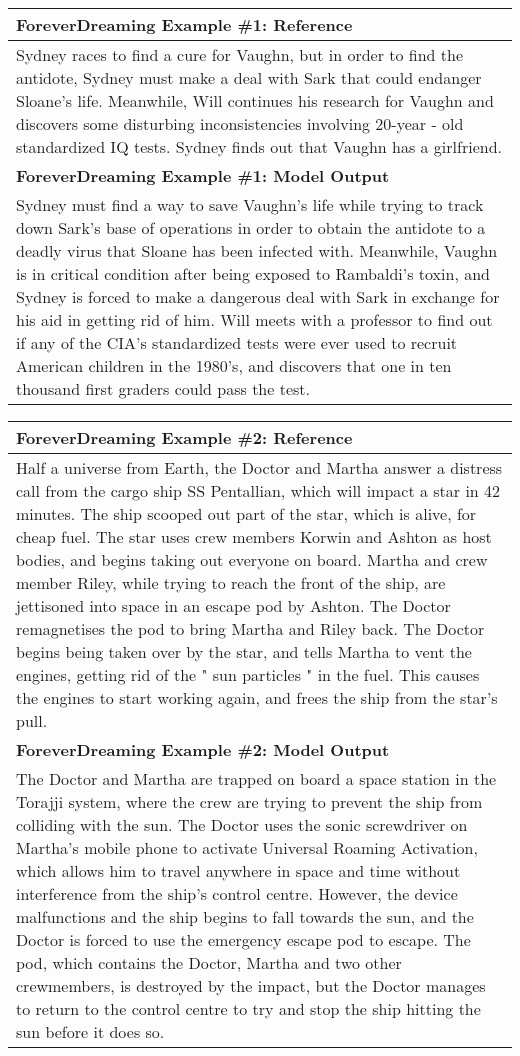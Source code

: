 \documentclass{article} \usepackage{iclr2022_conference,times}
\begin{document}
\begin{table}[!htbp]
    \centering
    \tiny
    \begin{tabular}{p{\linewidth}} 
    \toprule
    \textbf{ForeverDreaming Example \#1: Reference} \\
    \midrule
    Sydney races to find a cure for Vaughn, but in order to find the antidote, Sydney must make a deal with Sark that could endanger Sloane's life. Meanwhile, Will continues his research for Vaughn and discovers some disturbing inconsistencies involving 20-year - old standardized IQ tests. Sydney finds out that Vaughn has a girlfriend.
    \\
    \midrule
    \textbf{ForeverDreaming Example \#1: Model Output} \\
    \midrule
    Sydney must find a way to save Vaughn's life while trying to track down Sark's base of operations in order to obtain the antidote to a deadly virus that Sloane has been infected with. Meanwhile, Vaughn is in critical condition after being exposed to Rambaldi's toxin, and Sydney is forced to make a dangerous deal with Sark in exchange for his aid in getting rid of him. Will meets with a professor to find out if any of the CIA's standardized tests were ever used to recruit American children in the 1980's, and discovers that one in ten thousand first graders could pass the test.
    \\
    \end{tabular}
    \begin{tabular}{p{\linewidth}} 
    \midrule
    \textbf{ForeverDreaming Example \#2: Reference} \\
    \midrule
    Half a universe from Earth, the Doctor and Martha answer a distress call from the cargo ship SS Pentallian, which will impact a star in 42 minutes. The ship scooped out part of the star, which is alive, for cheap fuel. The star uses crew members Korwin and Ashton as host bodies, and begins taking out everyone on board. Martha and crew member Riley, while trying to reach the front of the ship, are jettisoned into space in an escape pod by Ashton. The Doctor remagnetises the pod to bring Martha and Riley back. The Doctor begins being taken over by the star, and tells Martha to vent the engines, getting rid of the " sun particles " in the fuel. This causes the engines to start working again, and frees the ship from the star's pull.
    \\
    \midrule
    \textbf{ForeverDreaming Example \#2: Model Output} \\
    \midrule
    The Doctor and Martha are trapped on board a space station in the Torajji system, where the crew are trying to prevent the ship from colliding with the sun. The Doctor uses the sonic screwdriver on Martha's mobile phone to activate Universal Roaming Activation, which allows him to travel anywhere in space and time without interference from the ship's control centre. However, the device malfunctions and the ship begins to fall towards the sun, and the Doctor is forced to use the emergency escape pod to escape. The pod, which contains the Doctor, Martha and two other crewmembers, is destroyed by the impact, but the Doctor manages to return to the control centre to try and stop the ship hitting the sun before it does so.

\end{tabular}
\end{table}
\end{document}
